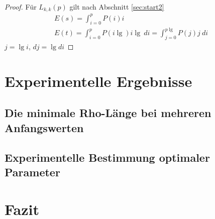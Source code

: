 \documentclass[a4paper, 10pt, ngerman]{article}
\begin{document}
\begin{proof}
    Für $L_{k, k}(p)$ gilt nach Abschnitt \ref{sec:start2}
    \begin{align*}
        E(s) = \int_{i = 0}^p P(i)i \\
        E(t) = \int_{i = 0}^p P(i \lg) i \lg \ di = \int_{j = 0}^{p \lg} P(j)j \ di
    \end{align*}
    $j = \lg i$, $dj = \lg di$
\end{proof}

\section{Experimentelle Ergebnisse}\label{sec:ex}

\subsection{Die minimale Rho-Länge bei mehreren Anfangswerten}

\subsection{Experimentelle Bestimmung optimaler Parameter}

\section{Fazit}

\printbibliography
\end{document}

